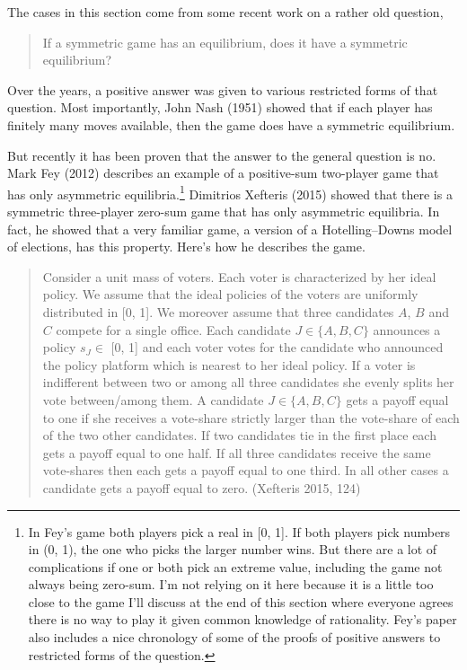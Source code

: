 \documentclass[
  11pt,
]{article}
\begin{document}
The cases in this section come from some recent work on a rather old question,

\begin{quote}
If a symmetric game has an equilibrium, does it have a symmetric equilibrium?
\end{quote}

Over the years, a positive answer was given to various restricted forms of that question. Most importantly, John Nash (1951) showed that if each player has finitely many moves available, then the game does have a symmetric equilibrium.

But recently it has been proven that the answer to the general question is no. Mark Fey (2012) describes an example of a positive-sum two-player game that has only asymmetric equilibria.\footnote{In Fey's game both players pick a real in {[}0, 1{]}. If both players pick numbers in (0, 1), the one who picks the larger number wins. But there are a lot of complications if one or both pick an extreme value, including the game not always being zero-sum. I'm not relying on it here because it is a little too close to the game I'll discuss at the end of this section where everyone agrees there is no way to play it given common knowledge of rationality. Fey's paper also includes a nice chronology of some of the proofs of positive answers to restricted forms of the question.} Dimitrios Xefteris (2015) showed that there is a symmetric three-player zero-sum game that has only asymmetric equilibria. In fact, he showed that a very familiar game, a version of a Hotelling--Downs model of elections, has this property. Here's how he describes the game.

\begin{quote}
Consider a unit mass of voters. Each voter is characterized by her ideal policy. We assume that the ideal policies of the voters are uniformly distributed in {[}0, 1{]}. We moreover assume that three candidates \(A\), \(B\) and \(C\) compete for a single office. Each candidate \(J \in \{A, B, C\}\) announces a policy \(s_J \in\) {[}0, 1{]} and each voter votes for the candidate who announced the policy platform which is nearest to her ideal policy. If a voter is indifferent between two or among all three candidates she evenly splits her vote between/among them. A candidate \(J \in \{A, B, C\}\) gets a payoff equal to one if she receives a vote-share strictly larger than the vote-share of each of the two other candidates. If two candidates tie in the first place each gets a payoff equal to one half. If all three candidates receive the same vote-shares then each gets a payoff equal to one third. In all other cases a candidate gets a payoff equal to zero. (Xefteris 2015, 124)
\end{quote}
\end{document}

